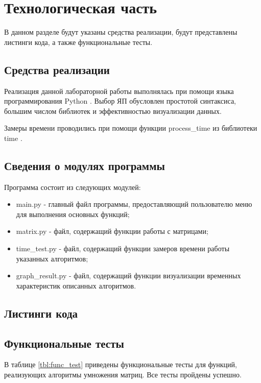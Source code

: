 \chapter{Технологическая часть}

В данном разделе будут указаны средства реализации, будут представлены листинги кода, а также функциональные тесты.

\section{Средства реализации}

Реализация данной лабораторной работы выполнялась при помощи языка программирования Python \cite{python}. Выбор ЯП обусловлен простотой синтаксиса, большим числом библиотек и эффективностью визуализации данных.

Замеры времени проводились при помощи функции process\_time из библиотеки time \cite{python-time}.

\section{Сведения о модулях программы}

Программа состоит из следующих модулей:

\begin{itemize}
	\item main.py - главный файл программы, предоставляющий пользователю меню для выполнения основных функций;
	\item matrix.py - файл, содержащий функции работы с матрицами;
	\item time\_test.py - файл, содержащий функции замеров времени работы указанных алгоритмов;
	\item graph\_result.py - файл, содержащий функции визуализации временных характеристик описанных алгоритмов.
\end{itemize}

\section{Листинги кода}



\section{Функциональные тесты}

В таблице \ref{tbl:func_test} приведены функциональные тесты для функций, реализующих алгоритмы умножения матриц. Все тесты пройдены успешно.

